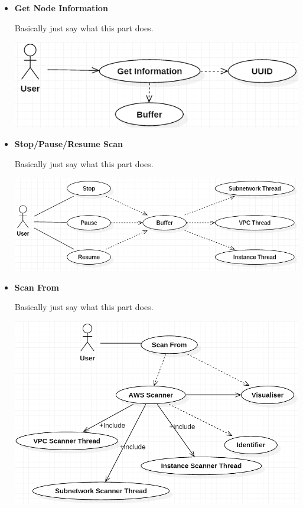 \documentclass[a4paper,12pt]{report}
\begin{document}
\begin{itemize}
	\item \textbf{Get Node Information}
	\begin{flushleft}
		Basically just say what this part does.
	\end{flushleft}
	\begin{center}
		\includegraphics[width=1\textwidth] {./Diagrams/GetNodeInformationUseCase.png}\\[0.4cm]    
	\end{center}


	\item \textbf{Stop/Pause/Resume Scan}
	\begin{flushleft}
		Basically just say what this part does.
	\end{flushleft}
	\begin{center}
		\includegraphics[width=1\textwidth] {./Diagrams/StopResumePauseUseCase.png}\\[0.4cm]    
	\end{center}

	\item \textbf{Scan From}
	\begin{flushleft}
		Basically just say what this part does.
	\end{flushleft}
	\begin{center}
		\includegraphics[width=1\textwidth] {./Diagrams/ScanFromUseCase.png}\\[0.4cm]    
	\end{center}


\end{itemize}
\end{document}
